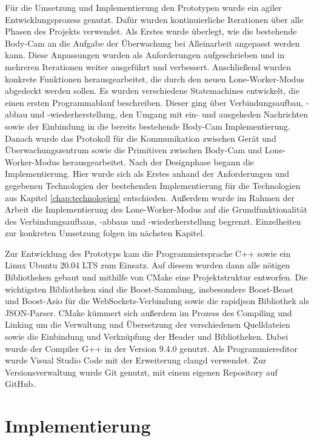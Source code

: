 \documentclass[thesis.tex]{subfiles}
\begin{document}
Für die Umsetzung und Implementierung den Prototypen wurde ein agiler Entwicklungsprozess genutzt.
Dafür wurden kontinuierliche Iterationen über alle Phasen des Projekts verwendet.
Als Erstes wurde überlegt, wie die bestehende Body-Cam an die Aufgabe der Überwachung bei Alleinarbeit angepasst werden kann.
Diese Anpassungen wurden als Anforderungen aufgeschrieben und in mehreren Iterationen weiter ausgeführt und verbessert.
Anschließend wurden konkrete Funktionen herausgearbeitet, die durch den neuen Lone-Worker-Modus abgedeckt werden sollen.
Es wurden verschiedene Statemachines entwickelt, die einen ersten Programmablauf beschreiben.
Dieser ging über Verbindungsaufbau, -abbau und -wiederherstellung, den Umgang mit ein- und ausgeheden Nachrichten sowie der Einbindung in die bereits bestehende Body-Cam Implementierung.
Danach wurde das Protokoll für die Kommunikation zwischen Gerät und Überwachungszentrum sowie die Primitiven zwischen Body-Cam und Lone-Worker-Modus herausgearbeitet.
Nach der Designphase begann die Implementierung.
Hier wurde sich als Erstes anhand der Anforderungen und gegebenen Technologien der bestehenden Implementierung für die Technologien aus Kapitel \autoref{chap:technologien} entschieden.
Außerdem wurde im Rahmen der Arbeit die Implementierung des Lone-Worker-Modus auf die Grundfunktionalität des Verbindungsaufbaus, -abbaus und -wiederherstellung begrenzt.
Einzelheiten zur konkreten Umsetzung folgen im nächsten Kapitel.

Zur Entwicklung des Prototyps kam die Programmiersprache C++ sowie ein Linux Ubuntu 20.04 LTS zum Einsatz.
Auf diesem wurden dann alle nötigen Bibliotheken gebaut und mithilfe von CMake eine Projektstruktur entworfen.
Die wichtigsten Bibliotheken sind die Boost-Sammlung, insbesondere Boost-Beast und Boost-Asio für die WebSockets-Verbindung sowie die \glqq rapidjson\grqq{} Bibliothek als JSON-Parser.
CMake kümmert sich außerdem im Prozess des Compiling und Linking um die Verwaltung und Übersetzung der verschiedenen Quelldateien
sowie die Einbindung und Verknüpfung der Header und Bibliotheken.
Dabei wurde der Compiler G++ in der Version 9.4.0 genutzt.
Als Programmiereditor wurde Visual Studio Code mit der Erweiterung \glqq clangd\grqq{} verwendet.
Zur Versionsverwaltung wurde Git genutzt, mit einem eigenen Repository auf GitHub.

\section{Implementierung}
\end{document}
